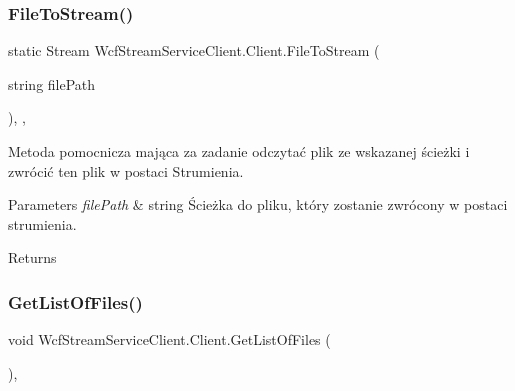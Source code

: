\mbox{\label{class_wcf_stream_service_client_1_1_client_a9a86790db59d7ada6ba7c67d470904dc}} 
\subsubsection{\texorpdfstring{File\+To\+Stream()}{FileToStream()}}
{\footnotesize\ttfamily static Stream Wcf\+Stream\+Service\+Client.\+Client.\+File\+To\+Stream (\begin{DoxyParamCaption}\item[{string}]{file\+Path }\end{DoxyParamCaption})\hspace{0.3cm}{\ttfamily [inline]}, {\ttfamily [static]}, {\ttfamily [private]}}



Metoda pomocnicza mająca za zadanie odczytać plik ze wskazanej ścieżki i zwrócić ten plik w postaci Strumienia. 


\begin{DoxyParams}{Parameters}
{\em file\+Path} & string Ścieżka do pliku, który zostanie zwrócony w postaci strumienia.\\
\hline
\end{DoxyParams}
\begin{DoxyReturn}{Returns}

\end{DoxyReturn}
\mbox{\label{class_wcf_stream_service_client_1_1_client_a7ad1660ea61123c161159cb54d863021}} 
\subsubsection{\texorpdfstring{Get\+List\+Of\+Files()}{GetListOfFiles()}}
{\footnotesize\ttfamily void Wcf\+Stream\+Service\+Client.\+Client.\+Get\+List\+Of\+Files (\begin{DoxyParamCaption}{ }\end{DoxyParamCaption})\hspace{0.3cm}{\ttfamily [inline]}, {\ttfamily [private]}}



